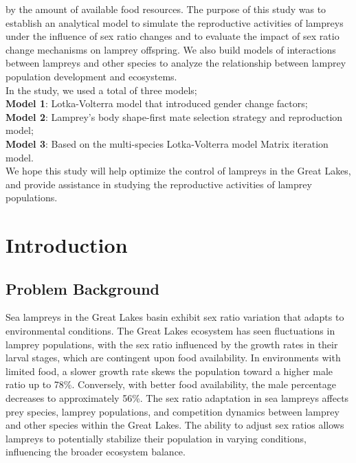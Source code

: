 \documentclass[12pt]{article}
\begin{document}
by the amount of available food resources. The purpose of this study was to establish an analytical model 
to simulate the reproductive activities of lampreys under the influence of sex ratio changes and to 
evaluate the impact of sex ratio change mechanisms on lamprey offspring. We also build models of 
interactions between lampreys and other species to analyze the relationship between lamprey population 
development and ecosystems. \\
\quad In the study, we used a total of three models; \\
\textbf{Model 1}: Lotka-Volterra model that introduced gender change factors;\\
\textbf{Model 2}: Lamprey's body shape-first mate selection strategy and reproduction model;\\
\textbf{Model 3}: Based on the multi-species Lotka-Volterra model Matrix iteration model. \\
\quad We hope this study will help optimize the control of lampreys in the Great Lakes, and provide assistance in studying the reproductive activities of lamprey populations.
\newpage
\tableofcontents
\newpage
\clearpage
\pagestyle{fancy}
\newpage
\setcounter{page}{1}


\section{Introduction}
\subsection{Problem Background}
\quad Sea lampreys in the Great Lakes basin exhibit sex ratio variation that adapts to environmental conditions.
The Great Lakes ecosystem has seen fluctuations in lamprey populations, with the sex ratio influenced by
the growth rates in their larval stages, which are contingent upon food availability. In environments with
limited food, a slower growth rate skews the population toward a higher male ratio up to 78\%. Conversely,
with better food availability, the male percentage decreases to approximately 56\%. The sex ratio adaptation
in sea lampreys affects prey species, lamprey populations, and competition dynamics between lamprey and other
species within the Great Lakes. The ability to adjust sex ratios allows lampreys to potentially stabilize
their population in varying conditions, influencing the broader ecosystem balance.
\end{document}
